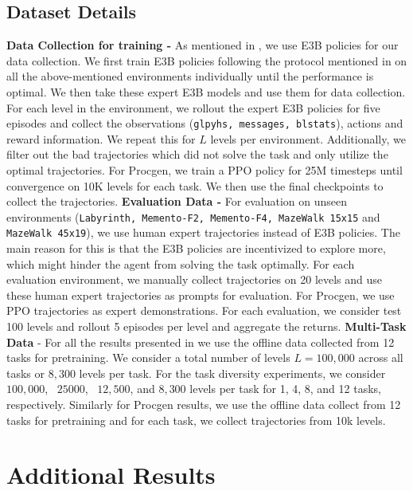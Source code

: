 \documentclass[]{fairmeta}
\begin{document}
\subsection{Dataset Details}
\label{app:expert_data}
\textbf{Data Collection  for training - }
As mentioned in , we use E3B policies \citep{E3B} for our data collection. We first train E3B policies following the protocol mentioned in \cite{E3B} on all the above-mentioned environments individually until the performance is optimal. We then take these expert E3B models and use them for data collection. For each level in the environment, we rollout the expert E3B policies for five episodes and collect the observations (\texttt{glpyhs, messages, blstats}), actions and reward information. We repeat this for $L$ levels per environment. Additionally, we filter out the bad trajectories which did not solve the task and only utilize the optimal trajectories.
For Procgen, we train a PPO policy for 25M timesteps until convergence on 10K levels for each task. We then use the final checkpoints to collect the trajectories.
\textbf{Evaluation Data -} For evaluation on unseen environments (\texttt{Labyrinth, Memento-F2, Memento-F4, MazeWalk 15x15} and \texttt{MazeWalk 45x19}), we use human expert trajectories instead of E3B policies. The main reason for this is that the E3B policies are incentivized to explore more, which might hinder the agent from solving the task optimally. For each evaluation environment, we manually collect trajectories on 20 levels and use these human expert trajectories as prompts for evaluation.
For Procgen, we use PPO trajectories as expert demonstrations. For each evaluation, we consider test 100 levels and rollout 5 episodes per level and aggregate the returns.
\textbf{Multi-Task Data} - For all the results presented in  we use the offline data collected from 12 tasks for pretraining. We consider a total number of levels $L = 100,000$ across all tasks or $8,300$ levels per task. For the task diversity experiments, we consider $100,000$, \ $25000$,  \ $12,500$, and $8,300$ levels per task for 1, 4, 8, and 12 tasks, respectively.
Similarly for Procgen results, we use the offline data collect from 12 tasks for pretraining and for each task, we collect trajectories from 10k levels.
\label{app:sequence_construction}
\section{Additional Results}
\end{document}
